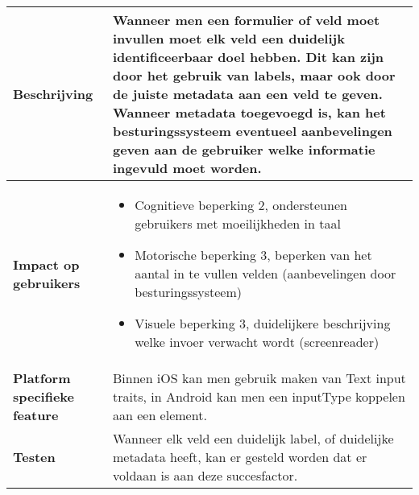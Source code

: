 \begin{table}[H]
\begin{tabular}{|l|p{12cm}|}
        \textbf{Beschrijving}                 & Wanneer men een formulier of veld moet invullen moet elk veld een duidelijk identificeerbaar doel hebben. Dit kan zijn door het gebruik van labels, maar ook door de juiste metadata aan een veld te geven. Wanneer metadata toegevoegd is, kan het besturingssysteem eventueel aanbevelingen geven aan de gebruiker welke informatie ingevuld moet worden. \\ 
        \hline
        \textbf{Impact op gebruikers}         &  
        \begin{itemize}
            \item Cognitieve beperking 2, ondersteunen gebruikers met moeilijkheden in taal
            \item Motorische beperking 3, beperken van het aantal in te vullen velden (aanbevelingen door besturingssysteem)
            \item Visuele beperking 3, duidelijkere beschrijving welke invoer verwacht wordt (screenreader)
        \end{itemize}                                                                                                                                                                                                                                                                                                                                                                                                                    \\ 
        \hline
        \textbf{Platform specifieke feature}  & Binnen iOS kan men gebruik maken van Text input traits, in Android kan men een inputType koppelen aan een element.                                                                                                                                                                                                                                                                                                      \\ 
        \hline
        \textbf{Testen}                       & Wanneer elk veld een duidelijk label, of duidelijke metadata heeft, kan er gesteld worden dat er voldaan is aan deze succesfactor.                                                                                                                                                                                                                                                                                                                 \\
        \hline
    \end{tabular}
\end{table}

